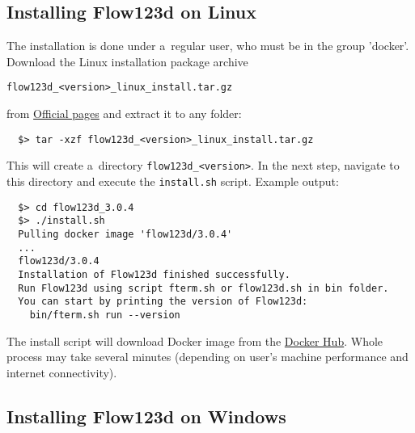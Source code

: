 \subsection{Installing Flow123d on Linux}
The installation is done under a~regular user, who must be in the group 'docker'.
Download the Linux installation package archive
\begin{center}
\verb'flow123d_<version>_linux_install.tar.gz'
\end{center}
from \href{http://flow123d.github.io/}{Official pages} and extract it to any folder:
\begin{verbatim}
  $> tar -xzf flow123d_<version>_linux_install.tar.gz
\end{verbatim}
This will create a~directory \verb'flow123d_<version>'. In the next step, navigate to this directory
and execute the \verb'install.sh' script. Example output:
\begin{verbatim}
  $> cd flow123d_3.0.4
  $> ./install.sh
  Pulling docker image 'flow123d/3.0.4'
  ...
  flow123d/3.0.4
  Installation of Flow123d finished successfully.
  Run Flow123d using script fterm.sh or flow123d.sh in bin folder.
  You can start by printing the version of Flow123d:
    bin/fterm.sh run --version
\end{verbatim}
The install script will download Docker image from the \href{https://hub.docker.com/u/flow123d}{Docker Hub}.
Whole process may take several minutes (depending on user's machine performance and internet connectivity).



\subsection{Installing Flow123d on Windows}
